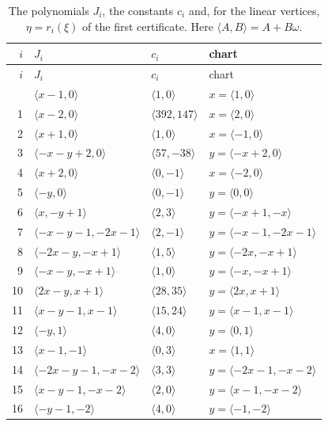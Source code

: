 \documentclass[11pt]{article}
\begin{document}
\begingroup\small
\setlength{\LTcapwidth}{\textwidth}
\begin{longtable}{@{}rlll@{}}
\caption{The polynomials $J_i$, the constants $c_i$ and, for the linear vertices, $\eta=r_i(\xi)$ of the first certificate. Here $\langle A,B\rangle=A+B\omega$.}\label{tab:cvert1}\\
\hline $i$ & $J_i$ & $c_i$ & chart\\\hline\endfirsthead\hline $i$ & $J_i$ & $c_i$ & chart\\\hline\endhead\hline\endfoot
0 & $\langle x-1,0\rangle$ & $\langle 1,0\rangle$ & $x=\langle 1,0\rangle$\\
1 & $\langle x-2,0\rangle$ & $\langle 392,147\rangle$ & $x=\langle 2,0\rangle$\\
2 & $\langle x+1,0\rangle$ & $\langle 1,0\rangle$ & $x=\langle -1,0\rangle$\\
3 & $\langle -x-y+2,0\rangle$ & $\langle 57,-38\rangle$ & $y=\langle -x+2,0\rangle$\\
4 & $\langle x+2,0\rangle$ & $\langle 0,-1\rangle$ & $x=\langle -2,0\rangle$\\
5 & $\langle -y,0\rangle$ & $\langle 0,-1\rangle$ & $y=\langle 0,0\rangle$\\
6 & $\langle x,-y+1\rangle$ & $\langle 2,3\rangle$ & $y=\langle -x+1,-x\rangle$\\
7 & $\langle -x-y-1,-2x-1\rangle$ & $\langle 2,-1\rangle$ & $y=\langle -x-1,-2x-1\rangle$\\
8 & $\langle -2x-y,-x+1\rangle$ & $\langle 1,5\rangle$ & $y=\langle -2x,-x+1\rangle$\\
9 & $\langle -x-y,-x+1\rangle$ & $\langle 1,0\rangle$ & $y=\langle -x,-x+1\rangle$\\
10 & $\langle 2x-y,x+1\rangle$ & $\langle 28,35\rangle$ & $y=\langle 2x,x+1\rangle$\\
11 & $\langle x-y-1,x-1\rangle$ & $\langle 15,24\rangle$ & $y=\langle x-1,x-1\rangle$\\
12 & $\langle -y,1\rangle$ & $\langle 4,0\rangle$ & $y=\langle 0,1\rangle$\\
13 & $\langle x-1,-1\rangle$ & $\langle 0,3\rangle$ & $x=\langle 1,1\rangle$\\
14 & $\langle -2x-y-1,-x-2\rangle$ & $\langle 3,3\rangle$ & $y=\langle -2x-1,-x-2\rangle$\\
15 & $\langle x-y-1,-x-2\rangle$ & $\langle 2,0\rangle$ & $y=\langle x-1,-x-2\rangle$\\
16 & $\langle -y-1,-2\rangle$ & $\langle 4,0\rangle$ & $y=\langle -1,-2\rangle$\\

\end{longtable}
\end{document}

